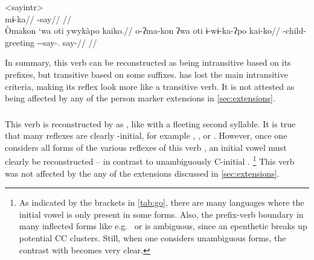 \pex<sayintr>
 \akuriyo \parencite[][113]{meira1998proto}\\
\begingl
\gla mɨ-ka//
\glb {}-say//
\glft {}//
\endgl
{} \kalina \parencite[][202]{courtz2008carib}\\
\begingl
\glpreamble Òmakon `wa oti ywykàpo kaiko.//
\gla o-ʔma-kon ʔwa oti ɨ-wɨ-ka-ʔpo kai-ko//
\glb {}-child-  greeting --say-. say-//
\glft {}//
\endgl
\xe

In summary, this verb can be reconstructed as being intransitive based on its prefixes, but transitive based on some suffixes.
\hixka has lost the main intransitive criteria, making its reflex look more like a transitive verb.
It is not attested as being affected by any of the person marker extensions  in \cref{sec:extensions}.

\subsubsection{ }
\label{sec:go}
This verb is reconstructed by \textcite{gildea2007greenberg} as , like   with a fleeting second syllable.
It is true that many reflexes are clearly -initial, for example \hixka {}  \parencite[27]{hixkaryanaderby1985}, \trio {}  \parencite[246]{triomeira1999}, or \wayana {}  \parencite[195]{wayanatavares2005}.
However, once one considers all forms of the various reflexes of this verb , an initial vowel  must clearly be reconstructed -- in contrast to unambiguously C-initial  .%
\footnote{As indicated by the brackets in \cref{tab:go}, there are many languages where the initial vowel is only present in some forms.
Also, the prefix-verb boundary in many inflected forms like e.g.\ \trio {} or \arara {}  \parencites[43]{triomeira1999}[153]{alves2017arara} is ambiguous, since an epenthetic  breaks up potential CC clusters.
Still, when one considers unambiguous forms, the contrast with  becomes very clear.}
This verb was not affected by the any of the extensions discussed in \cref{sec:extensions}.



